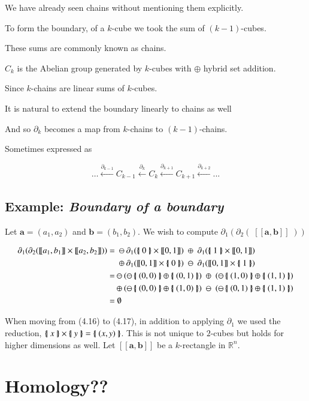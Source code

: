 We have already seen chains without mentioning them explicitly.

To form the boundary, of a $k$-cube we took the sum of $(k-1)$-cubes.

These sums are commonly known as chains.

\begin{definition}
	$C_k$ is the Abelian group generated by $k$-cubes with $\oplus$ hybrid set addition.
\end{definition}

Since $k$-chains are linear sums of $k$-cubes.

It is natural to extend the boundary linearly to chains as well

And so $\partial_k$ becomes a map from $k$-chains to $(k-1)$-chains.

Sometimes expressed as

\begin{equation}
	\ldots \xleftarrow{\partial_{k-1}} C_{k-1} \xleftarrow{\partial_{k}} C_k \xleftarrow{\partial_{k+1}} C_{k+1} \xleftarrow{\partial_{k+2}} ...
\end{equation}




\subsection{Example: \emph{Boundary of a boundary}}
Let $\boldsymbol{a} =(a_1,a_2)$ and $\boldsymbol{b}= (b_1,b_2)$.
We wish to compute $\partial_1 ( \partial_2 ( \; [\![\boldsymbol{a}, \boldsymbol{b} ]\!] \; ) )$

\begin{align}
	\partial_1 ( \partial_2 ( [\![ a_1 , b_1 ]\!] \times [\![a_2, b_2 ]\!] ) )
	=	& \; \ominus \partial_1( \hset{0} \times [\![0,1]\!]) \; \oplus 	\; \partial_1(\hset{1} \times [\![0,1]\!]) \notag \\
		& \; \oplus 	\partial_1( [\![0,1]\!] \times \hset{0}) \; \ominus \; \partial_1([\![0,1]\!] \times \hset{1}) \\
	=	& \ominus	( \ominus \hset{(0,0)} \oplus \hset{(0,1)} ) \; \oplus \; 	(\ominus \hset{(1,0)} \oplus \hset{(1,1)}) \notag \\
		& \oplus 	( \ominus \hset{(0,0)} \oplus \hset{(1,0)} ) \; \ominus \;	(\ominus \hset{(0,1)} \oplus \hset{(1,1)}) \\
	=	& \;\emptyset	
\end{align}

When moving from (4.16) to (4.17), in addition to applying $\partial_1$ we used the reduction, $\left\{ \! \left| \; x \; \right| \! \right\} \times \left\{ \! \left| \; y \; \right| \! \right\} = \left\{ \! \left| \;  (x,y)  \; \right| \! \right\}$.
This is not unique to $2$-cubes but holds for higher dimensions as well.
Let $[\![\boldsymbol{a}, \boldsymbol{b}]\!]$ be a $k$-rectangle in $\mathbb{R}^n$.
 

\section{Homology??}

